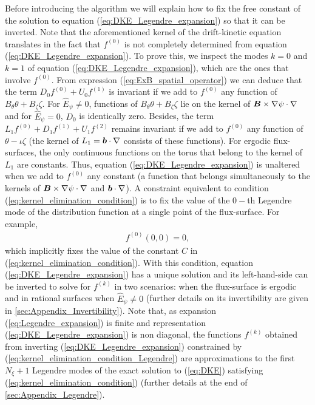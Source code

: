 \documentclass[10pt]{iopart}
\begin{document}
Before introducing the algorithm we will explain how to fix the free constant of the solution to equation (\ref{eq:DKE_Legendre_expansion}) so that it can be inverted. Note that the aforementioned kernel of the drift-kinetic equation translates in the fact that $f^{(0)}$ is not completely determined from equation (\ref{eq:DKE_Legendre_expansion}). To prove this, we inspect the modes $k=0$ and $k=1$ of equation (\ref{eq:DKE_Legendre_expansion}), which are the ones that involve $f^{(0)}$. From expression (\ref{eq:ExB_spatial_operator}) we can deduce that the term $D_0 f^{(0)} + U_0 f^{(1)} $ is invariant if we add to $f^{(0)}$ any function of $B_\theta \theta + B_\zeta  \zeta$. For $\widehat{E}_\psi\ne 0$, functions of $B_\theta \theta + B_\zeta  \zeta$ lie on the kernel of $\vb*{B}\times\nabla \psi \cdot \nabla$ and for $\widehat{E}_\psi = 0$, $D_0$ is identically zero. Besides, the term $L_1 f^{(0)} + D_1 f^{(1)} + U_1 f^{(2)}$ remains invariant if we add to $f^{(0)} $ any function of $\theta-\iota\zeta$ (the kernel of $L_1=\vb*{b}\cdot\nabla$ consists of these functions). For ergodic flux-surfaces, the only continuous functions on the torus that belong to the kernel of $L_1$ are constants. Thus, equation (\ref{eq:DKE_Legendre_expansion}) is unaltered when we add to $f^{(0)}$ any constant (a function that belongs simultaneously to the kernels of $\vb*{B}\times\nabla \psi \cdot \nabla$ and $\vb*{b}\cdot\nabla$). A constraint equivalent to condition (\ref{eq:kernel_elimination_condition}) is to fix the value of the $0-$th Legendre mode of the distribution function at a single point of the flux-surface. For example,
%
\begin{align}
	f^{(0)}(0,0)=0, \label{eq:kernel_elimination_condition_Legendre}
\end{align}
which implicitly fixes the value of the constant $C$ in (\ref{eq:kernel_elimination_condition}).
With this condition, equation (\ref{eq:DKE_Legendre_expansion}) has a unique solution and its left-hand-side can be inverted  to solve for $f^{(k)}$ in two scenarios: when the flux-surface is ergodic and in rational surfaces when $\widehat{E}_\psi\ne0$ (further details on its invertibility are given in \ref{sec:Appendix_Invertibility}). Note that, as expansion (\ref{eq:Legendre_expansion}) is finite and representation (\ref{eq:DKE_Legendre_expansion}) is non diagonal, the functions $f^{(k)}$ obtained from inverting (\ref{eq:DKE_Legendre_expansion}) constrained by (\ref{eq:kernel_elimination_condition_Legendre}) are approximations to the first $N_\xi+1$ Legendre modes of the exact solution to (\ref{eq:DKE}) satisfying (\ref{eq:kernel_elimination_condition}) (further details at the end of \ref{sec:Appendix_Legendre}).
\end{document}

